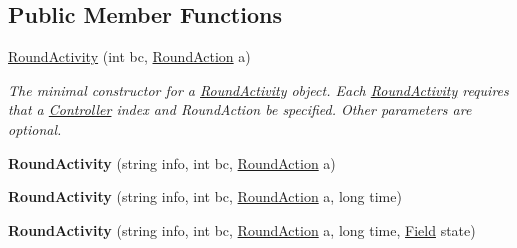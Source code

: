 \subsection*{Public Member Functions}
\begin{DoxyCompactItemize}
\item 
\hypertarget{class_m_b_c_1_1_core_1_1_round_log_1_1_round_activity_afa28bd29e4c11ad135efc72c1cc2f499}{\hyperlink{class_m_b_c_1_1_core_1_1_round_log_1_1_round_activity_afa28bd29e4c11ad135efc72c1cc2f499}{Round\-Activity} (int bc, \hyperlink{class_m_b_c_1_1_core_1_1_round_log_af3f9f76d90fb391108dd1eaeaeae27e4}{Round\-Action} a)}\label{class_m_b_c_1_1_core_1_1_round_log_1_1_round_activity_afa28bd29e4c11ad135efc72c1cc2f499}

\begin{DoxyCompactList}\small\item\em The minimal constructor for a \hyperlink{class_m_b_c_1_1_core_1_1_round_log_1_1_round_activity}{Round\-Activity} object. Each \hyperlink{class_m_b_c_1_1_core_1_1_round_log_1_1_round_activity}{Round\-Activity} requires that a \hyperlink{class_m_b_c_1_1_core_1_1_controller}{Controller} index and Round\-Action be specified. Other parameters are optional. \end{DoxyCompactList}\item 
\hypertarget{class_m_b_c_1_1_core_1_1_round_log_1_1_round_activity_a88d7690a89cdcf004b0bf98bd851f865}{{\bfseries Round\-Activity} (string info, int bc, \hyperlink{class_m_b_c_1_1_core_1_1_round_log_af3f9f76d90fb391108dd1eaeaeae27e4}{Round\-Action} a)}\label{class_m_b_c_1_1_core_1_1_round_log_1_1_round_activity_a88d7690a89cdcf004b0bf98bd851f865}

\item 
\hypertarget{class_m_b_c_1_1_core_1_1_round_log_1_1_round_activity_aa70dc49936b51e6afdee215ef284d3bb}{{\bfseries Round\-Activity} (string info, int bc, \hyperlink{class_m_b_c_1_1_core_1_1_round_log_af3f9f76d90fb391108dd1eaeaeae27e4}{Round\-Action} a, long time)}\label{class_m_b_c_1_1_core_1_1_round_log_1_1_round_activity_aa70dc49936b51e6afdee215ef284d3bb}

\item 
\hypertarget{class_m_b_c_1_1_core_1_1_round_log_1_1_round_activity_af2a43e61c9bf543f45c056f66b3c48e5}{{\bfseries Round\-Activity} (string info, int bc, \hyperlink{class_m_b_c_1_1_core_1_1_round_log_af3f9f76d90fb391108dd1eaeaeae27e4}{Round\-Action} a, long time, \hyperlink{class_m_b_c_1_1_core_1_1_field}{Field} state)}\label{class_m_b_c_1_1_core_1_1_round_log_1_1_round_activity_af2a43e61c9bf543f45c056f66b3c48e5}


\end{DoxyCompactItemize}
